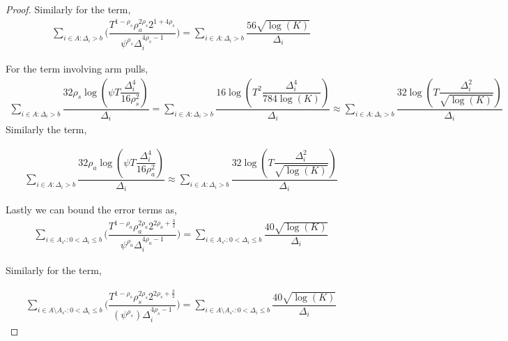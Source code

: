 \begin{proof}
	Similarly for the term,
	\begin{align*}
	\sum_{i\in A:\Delta_{i} > b}\bigg(\dfrac{T^{1-\rho_{s}}\rho_{a}^{2\rho_{s}}2^{1+4\rho_{s}}}{\psi^{\rho_{s}}\Delta_{i}^{4\rho_{s}-1}} \bigg) = \sum_{i\in A:\Delta_{i} > b}\dfrac{56\sqrt{\log (K)}}{\Delta_{i}}
	\end{align*}		
			
	
	For the term involving arm pulls,
	\begin{align*}
	\sum_{i\in A:\Delta_{i} > b}\dfrac{32\rho_{s}\log{(\psi T\dfrac{\Delta_{i}^{4}}{16\rho_{s}^{2}})}}{\Delta_{i}}=\sum_{i\in A:\Delta_{i} > b}\dfrac{16\log{(T^{2}\dfrac{\Delta_{i}^{4}}{784\log (K)})}}{\Delta_{i}}\approx \sum_{i\in A:\Delta_{i} > b}\dfrac{32\log{(T\dfrac{\Delta_{i}^{2}}{\sqrt{\log (K)}})}}{\Delta_{i}}
	\end{align*}		
	 Similarly the term, 
	
	\begin{align*}
	\sum_{i\in A:\Delta_{i} > b}\dfrac{32\rho_{a}\log{(\psi T\dfrac{\Delta_{i}^{4}}{16\rho_{a}^{2}})}}{\Delta_{i}}\approx \sum_{i\in A:\Delta_{i} > b}\dfrac{32\log{(T\dfrac{\Delta_{i}^{2}}{\sqrt{\log (K)}})}}{\Delta_{i}}
	\end{align*}		 
	 

	Lastly we can bound the error terms as, 
	\begin{align*}
	\sum\limits_{i\in A_{s^{*}}:0 < \Delta_{i}\leq b}\bigg(\dfrac{T^{1-\rho_{a}}\rho_{a}^{2\rho_{a}}2^{2\rho_{a}+\frac{3}{2}}}{\psi^{\rho_{a}}\Delta_{i}^{4\rho_{a}-1}} \bigg)= \sum\limits_{i\in A_{s^{*}}:0 < \Delta_{i}\leq b}\dfrac{40\sqrt{\log (K)}}{\Delta_{i}}
	\end{align*}
	
	
	Similarly for the term,
	
	\begin{align*}
	\sum_{i\in A\setminus A_{s^*}: 0 < \Delta_{i} \leq b}\bigg(\dfrac{T^{1-\rho_{s}}\rho_{s}^{2\rho_{s}}2^{2\rho_{s}+\frac{3}{2}}}{(\psi^{\rho_{s}})\Delta_{i}^{4\rho_{s} -1}} \bigg)=\sum_{i\in A\setminus A_{s^*}: 0 < \Delta_{i} \leq b}\dfrac{40\sqrt{\log (K)}}{\Delta_{i}}
	\end{align*}	 
		

\end{proof}
